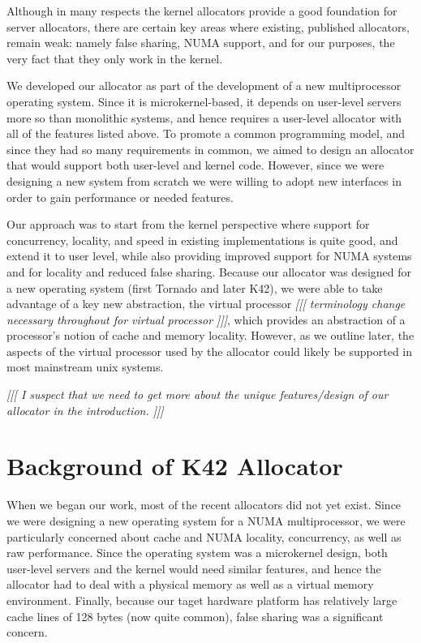 \documentclass[dvips,11pt]{article}
\newcommand\fixnote[1]{\emph{[[[ #1 ]]]}}
\begin{document}
Although in many respects the kernel allocators provide a good foundation
for server allocators, there are certain key areas where existing,
published allocators, remain weak: namely false sharing, NUMA support, and
for our purposes, the very fact that they only work in the kernel.

We developed our allocator as part of the development of a new
multiprocessor operating system.  Since it is microkernel-based, it depends
on user-level servers more so than monolithic systems, and hence requires a
user-level allocator with all of the features listed above.  To promote a
common programming model, and since they had so many requirements in
common, we aimed to design an allocator that would support both user-level
and kernel code.  However, since we were designing a new system from
scratch we were willing to adopt new interfaces in order to gain
performance or needed features.

Our approach was to start from the kernel perspective where support for
concurrency, locality, and speed in existing implementations is quite good,
and extend it to user level, while also providing improved support for NUMA
systems and for locality and reduced false sharing.  Because our allocator
was designed for a new operating system (first Tornado and later K42), we
were able to take advantage of a key new abstraction, the virtual processor
\fixnote{terminology change necessary throughout for virtual processor},
which provides an abstraction of a processor's notion of cache and memory
locality.  However, as we outline later, the aspects of the virtual
processor used by the allocator could likely be supported in most
mainstream unix systems.

\fixnote{I suspect that we need to get more about the unique
  features/design of our allocator in the introduction.}



\section{Background of K42 Allocator}

When we began our work, most of the recent allocators did not yet exist.
Since we were designing a new operating system for a NUMA multiprocessor,
we were particularly concerned about cache and NUMA locality, concurrency,
as well as raw performance.  Since the operating system was a microkernel
design, both user-level servers and the kernel would need similar features, 
and hence the allocator had to deal with a physical memory as well as a
virtual memory environment.  Finally, because our taget hardware platform
has relatively large cache lines of 128 bytes (now quite common), false
sharing was a significant concern.
\end{document}
